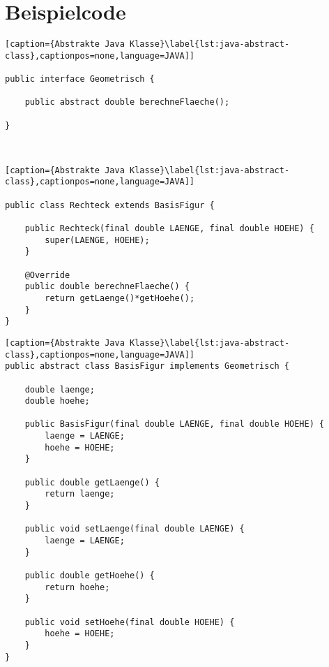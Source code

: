 \chapter{Beispielcode} 
 
 
\begin{minipage}[t]{0.45\linewidth}

	 \begin{lstlisting}[caption={Abstrakte Java Klasse}\label{lst:java-abstract-class},captionpos=none,language=JAVA]] 
	
public interface Geometrisch {

    public abstract double berechneFlaeche();
	
}



	\end{lstlisting}
	
	 \begin{lstlisting}[caption={Abstrakte Java Klasse}\label{lst:java-abstract-class},captionpos=none,language=JAVA]] 

public class Rechteck extends BasisFigur {

    public Rechteck(final double LAENGE, final double HOEHE) {
        super(LAENGE, HOEHE);
    }

    @Override
    public double berechneFlaeche() {
        return getLaenge()*getHoehe();
    }
}

	\end{lstlisting}	
	


\end{minipage}%
\hfill
\begin{minipage}[t]{0.45\linewidth}
    

	\begin{lstlisting}[caption={Abstrakte Java Klasse}\label{lst:java-abstract-class},captionpos=none,language=JAVA]] 
public abstract class BasisFigur implements Geometrisch {

    double laenge;
    double hoehe;
	
    public BasisFigur(final double LAENGE, final double HOEHE) {
        laenge = LAENGE;
        hoehe = HOEHE;
    }

    public double getLaenge() {
        return laenge;
    }

    public void setLaenge(final double LAENGE) {
        laenge = LAENGE;
    }

    public double getHoehe() {
        return hoehe;
    }

    public void setHoehe(final double HOEHE) {
        hoehe = HOEHE;
    }
}
	\end{lstlisting}
\end{minipage}


